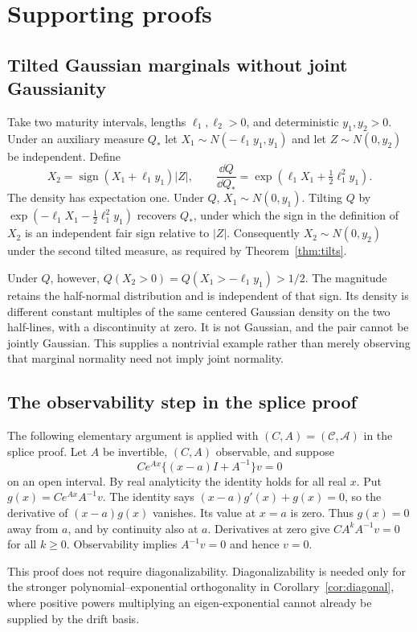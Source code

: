 \section{Supporting proofs}\label{app:proofs}
\subsection{Tilted Gaussian marginals without joint Gaussianity}
Take two maturity intervals, lengths $\ell_1,\ell_2>0$, and deterministic $y_1,y_2>0$. Under an auxiliary measure $Q_*$ let $X_1\sim N(-\ell_1y_1,y_1)$ and let $Z\sim N(0,y_2)$ be independent. Define
\[
X_2=\operatorname{sign}(X_1+\ell_1y_1)|Z|,
\qquad \frac{\dd Q}{\dd Q_*}=\exp(\ell_1X_1+\tfrac12\ell_1^2y_1).
\]
The density has expectation one. Under $Q$, $X_1\sim N(0,y_1)$. Tilting $Q$ by $\exp(-\ell_1X_1-\tfrac12\ell_1^2y_1)$ recovers $Q_*$, under which the sign in the definition of $X_2$ is an independent fair sign relative to $|Z|$. Consequently $X_2\sim N(0,y_2)$ under the second tilted measure, as required by Theorem~\ref{thm:tilts}.

Under $Q$, however, $Q(X_2>0)=Q(X_1>-\ell_1y_1)>1/2$. The magnitude retains the half-normal distribution and is independent of that sign. Its density is different constant multiples of the same centered Gaussian density on the two half-lines, with a discontinuity at zero. It is not Gaussian, and the pair cannot be jointly Gaussian. This supplies a nontrivial example rather than merely observing that marginal normality need not imply joint normality.

\subsection{The observability step in the splice proof}
The following elementary argument is applied with $(C,A)=(\mathcal C,\mathcal A)$ in the splice proof.
Let $A$ be invertible, $(C,A)$ observable, and suppose
\[
C e^{Ax}\{(x-a)I+A^{-1}\}v=0
\]
on an open interval. By real analyticity the identity holds for all real $x$. Put $g(x)=C e^{Ax}A^{-1}v$. The identity says $(x-a)g'(x)+g(x)=0$, so the derivative of $(x-a)g(x)$ vanishes. Its value at $x=a$ is zero. Thus $g(x)=0$ away from $a$, and by continuity also at $a$. Derivatives at zero give $CA^kA^{-1}v=0$ for all $k\ge0$. Observability implies $A^{-1}v=0$ and hence $v=0$.

This proof does not require diagonalizability. Diagonalizability is needed only for the stronger polynomial--exponential orthogonality in Corollary~\ref{cor:diagonal}, where positive powers multiplying an eigen-exponential cannot already be supplied by the drift basis.

